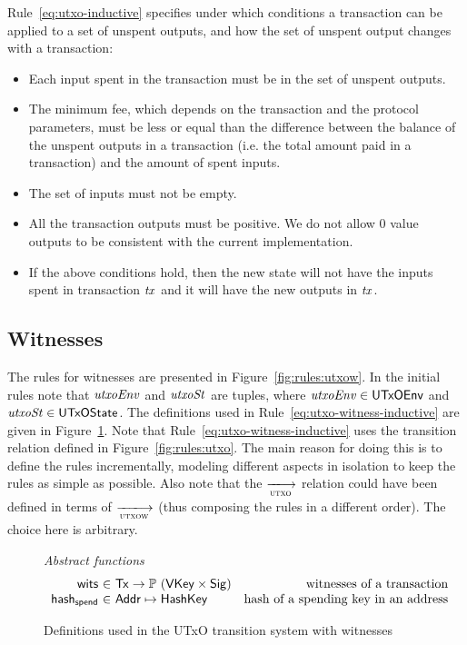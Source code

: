 Rule~\ref{eq:utxo-inductive} specifies under which conditions a transaction can
be applied to a set of unspent outputs, and how the set of unspent output
changes with a transaction:
\begin{itemize}
\item Each input spent in the transaction must be in the set of unspent
  outputs.
\item The minimum fee, which depends on the transaction and the protocol
  parameters, must be less or equal than the difference between the balance of
  the unspent outputs in a transaction (i.e. the total amount paid in a
  transaction) and the amount of spent inputs.
\item The set of inputs must not be empty.
\item All the transaction outputs must be positive. We do not allow $0$ value
  outputs to be consistent with the current implementation.
\item If the above conditions hold, then the new state will not have the inputs
  spent in transaction $\mathit{tx}$ and it will have the new outputs in
  $\mathit{tx}$.
\end{itemize}

\clearpage

\subsection{Witnesses}
\label{sec:witnesses}

The rules for witnesses are presented in Figure~\ref{fig:rules:utxow}. In the
initial rules note that $\mathit{utxoEnv}$ and $\mathit{utxoSt}$ are tuples, where
$\mathit{utxoEnv} \in \mathsf{UTxOEnv}$ and $\mathit{utxoSt} \in \mathsf{UTxOState}$. The definitions
used in Rule~\ref{eq:utxo-witness-inductive} are given in
Figure~\ref{fig:defs:utxow}. Note that Rule~\ref{eq:utxo-witness-inductive}
uses the transition relation defined in Figure~\ref{fig:rules:utxo}. The main
reason for doing this is to define the rules incrementally, modeling different
aspects in isolation to keep the rules as simple as possible. Also note that
the $\trans{utxo}{}$ relation could have been defined in terms of
$\trans{utxow}{}$ (thus composing the rules in a different order). The choice
here is arbitrary.

\begin{figure}[htb]
  \emph{Abstract functions}
  \begin{equation*}
    \begin{array}{r@{~\in~}lr}
      \fun{wits} & \Tx \to \powerset{(\VKey \times \Sig)}
      & \text{witnesses of a transaction}\\
      \fun{hash_{spend}} & \Addr \mapsto \HashKey
      & \text{hash of a spending key in an address}\\
    \end{array}
  \end{equation*}
  \caption{Definitions used in the UTxO transition system with witnesses}
  \label{fig:defs:utxow}
\end{figure}

